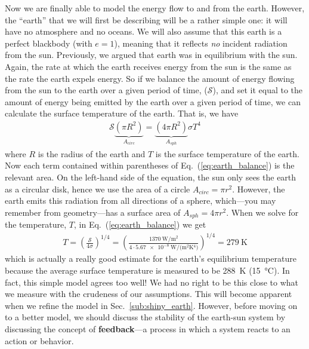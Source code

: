     Now we are finally able to model the energy flow to and from the earth. However, the ``earth'' that we will first be describing will be a rather simple one: it will have no atmosphere and no oceans. We will also assume that this earth is a perfect blackbody (with $e =1$), meaning that it reflects \emph{no} incident radiation from the sun. Previously, we argued that earth was in equilibrium with the sun. Again, the rate at which the earth receives energy from the sun is the same as the rate the earth expels energy. So if we balance the amount of energy flowing from the sun to the earth over a given period of time, ($\mathcal{S}$), and set it equal to the amount of energy being emitted by the earth over a given period of time, we can calculate the surface temperature of the earth. That is, we have
    \begin{align}
        \mathcal{S}\underbrace{(\pi R^2)}_{A_{circ}} = \underbrace{(4\pi R^2)}_{A_{sph}} \sigma T^4
        \label{eq:earth_balance}
    \end{align}
    where $R$ is the radius of the earth and $T$ is the surface temperature of the earth. Now each term contained within parentheses of Eq.~(\ref{eq:earth_balance}) is the relevant area. On the left-hand side of the equation, the sun only sees the earth as a circular disk, hence we use the area of a circle $A_{circ} = \pi r^2$. However, the earth emits this radiation from all directions of a sphere, which---you may remember from geometry---has a surface area of $A_{sph} = 4 \pi r^2$. When we solve for the temperature, $T$, in Eq.~(\ref{eq:earth_balance}) we get 
    \begin{align}
        T = \left( \frac{\mathcal{S}}{4 \sigma} \right)^{1/4} = \left( \frac{\SI{1370}{\watt/\meter^2}}{4 \cdot \SI{5.67e-8}{\watt/(\meter^2 \kelvin^4)} } \right)^{1/4} = \SI{279}{\kelvin}
        \label{eq:earth_temp}
    \end{align}
    which is actually a really good estimate for the earth's equilibrium temperature because the average surface temperature is measured to be \SI{288}{\kelvin} (\SI{15}{\celsius}).\cite{schroeder1999introduction} In fact, this simple model agrees too well! We had no right to be this close to what we measure with the crudeness of our assumptions. This will become apparent when we refine the model in Sec.~\ref{sub:shiny_earth}. However, before moving on to a better model, we should discuss the stability of the earth-sun system by discussing the concept of \textbf{feedback}---a process in which a system reacts to an action or behavior.


